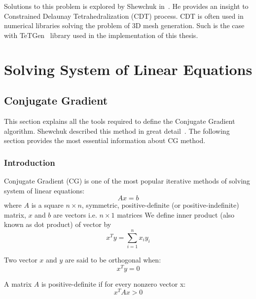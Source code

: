 \documentclass[en]{minipw} %
\begin{document}
Solutions to this problem is explored by Shewchuk in~\cite{delaunay_mesh, cdt}. He provides an insight to Constrained Delaunay Tetrahedralization (CDT) process. CDT is often used in numerical libraries solving the problem of 3D mesh generation. Such is the case with TeTGen~\cite{tetgen} library used in the implementation of this thesis.


\chapter{Solving System of Linear Equations}
\label{chap:system_linear}

\section{Conjugate Gradient}
This section explains all the tools required to define the Conjugate Gradient algorithm. Shewchuk described this method in great detail~\cite{cg}. The following section provides the most essential information about CG method.

\subsection{Introduction}
Conjugate Gradient (CG) is one of the most popular iterative methods of solving system of linear equations:
\begin{equation}
Ax=b
\end{equation}
where $A$ is a square $n \times n$, symmetric, positive-definite (or positive-indefinite) matrix, $x$ and $b$ are vectors i.e. $n \times 1$ matrices
We define inner product (also known as dot product) of vector by 
\begin{equation}
x^{T}y = \sum^{n}_{i=1} x_i y_i
\end{equation}

Two vector $x$ and $y$ are said to be orthogonal when:
\begin{equation}
x^{T}y = 0
\end{equation}

A matrix $A$ is positive-definite if for every nonzero vector x:
\begin{equation}
x^{T}Ax > 0
\end{equation}
\end{document}
